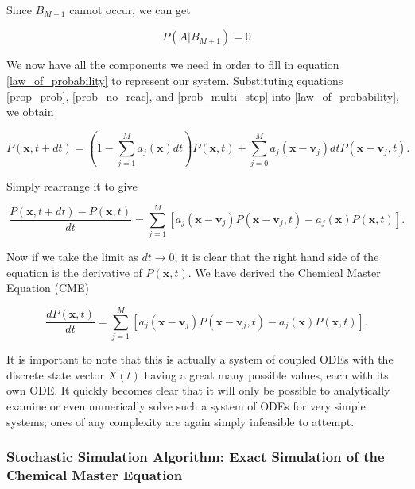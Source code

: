 \documentclass[ugrad,lot,lof,openright,11pt,oneside,onehalfspace]{RUthesis}
\begin{document}
				\noindent
				Since $B_{M+1}$ cannot occur, we can get

				\begin{equation}\label{prob_multi_step}
				P(A|B_{M+1}) = 0
				\end{equation}

				\noindent
				We now have all the components we need in order to fill in equation \eqref{law_of_probability} to represent our system. Substituting equations \eqref{prop_prob}, \eqref{prob_no_reac}, and \eqref{prob_multi_step} into \eqref{law_of_probability}, we obtain

				\begin{equation*}\label{law_of_prob_substituted}
				P(\mathbf{x},t+dt) = \left( 1 - \sum\limits_{j=1}^M a_j(\mathbf{x})dt \right)P(\mathbf{x},t) + \sum\limits_{j=0}^{M} a_j(\mathbf{x}-\mathbf{v}_j)dtP(\mathbf{x}-\mathbf{v}_j, t).
				\end{equation*}

				\noindent
				Simply rearrange it to give

				\begin{equation*}
				\frac{P(\mathbf{x},t+dt) - P(\mathbf{x},t)}{dt} = \sum\limits_{j=1}^M [ a_j(\mathbf{x}-\mathbf{v}_j)P(\mathbf{x}-\mathbf{v}_j, t) - a_j(\mathbf{x})P(\mathbf{x},t) ].
				\end{equation*}

				\noindent
				Now if we take the limit as $dt \rightarrow 0$, it is clear that the right hand side of the equation is the derivative of $P(\mathbf{x},t)$. We have derived the Chemical Master Equation (CME) \cite{cme_intro}

				\begin{equation}\label{chemical_master_equation}
				\frac{dP(\mathbf{x},t)}{dt} = \sum\limits_{j=1}^M [ a_j(\mathbf{x}-\mathbf{v}_j)P(\mathbf{x}-\mathbf{v}_j, t) - a_j(\mathbf{x})P(\mathbf{x},t) ].
				\end{equation}

				\noindent
				It is important to note that this is actually a system of coupled ODEs with the discrete state vector $X(t)$ having a great many possible values, each with its own ODE. It quickly becomes clear that it will only be possible to analytically examine or even numerically solve such a system of ODEs for very simple systems; ones of any complexity are again simply infeasible to attempt.


			\subsubsection{Stochastic Simulation Algorithm: Exact Simulation of the Chemical Master Equation}
\end{document}
